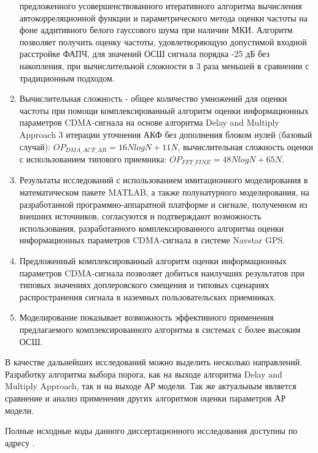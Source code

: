\begin{enumerate}
		предложенного усовершенствованного итеративного алгоритма вычисления автокорреляционной функции и параметрического
		метода оценки частоты на фоне аддитивного белого гауссового шума при наличии МКИ. Алгоритм позволяет получить оценку частоты, удовлетворяющую
		допустимой входной расстройке ФАПЧ, для значений ОСШ сигнала порядка -25 дБ без накопления, при вычислительной сложности в 3 раза меньшей в сравнении с традиционным подходом.
	\item Вычислительная сложность - общее количество умножений для оценки частоты при помощи комплексированный алгоритм оценки информационных параметров CDMA-сигнала
		на основе алгоритма Delay and Multiply Approach 3 итерации уточнения АКФ без дополнения блоком нулей (базовый случай): ${OP_{DMA\_ACF\_AR} = 16NlogN + 11N}$,
		вычислительная сложность оценки с использованием типового приемника: ${OP_{FFT\_FINE} = 48NlogN + 65N}$.
	\item Результаты исследований с использованием имитационного моделирования в математическом пакете MATLAB, а также полунатурного моделирования,
		на разработанной программно-аппаратной платформе и сигнале, полученном из внешних источников, согласуются и подтверждают возможность
		использования, разработанного комплексированного алгоритма оценки информационных параметров CDMA-сигнала в системе Navstar GPS.
	\item Предложенный комплексированный алгоритм оценки информационных параметров CDMA-сигнала позволяет добиться наилучших результатов при
		типовых значениях доплеровского смещения и типовых сценариях распространения сигнала в наземных пользовательских приемниках.
	\item Моделирование показывает возможность эффективного применения предлагаемого комплексированного алгоритма в системах с более высоким ОСШ.
\end{enumerate}

В качестве дальнейших исследований можно выделить несколько направлений. Разработку алгоритма выбора порога, как на выходе алгоритма Delay and Multiply Approach,
так и на выходе АР модели. Так же актуальным является сравнение и анализ применения других алгоритмов оценки параметров АР модели. 

Полные исходные коды данного диссертационного исследования доступны по адресу \cite{phdSRC}.

\clearpage
